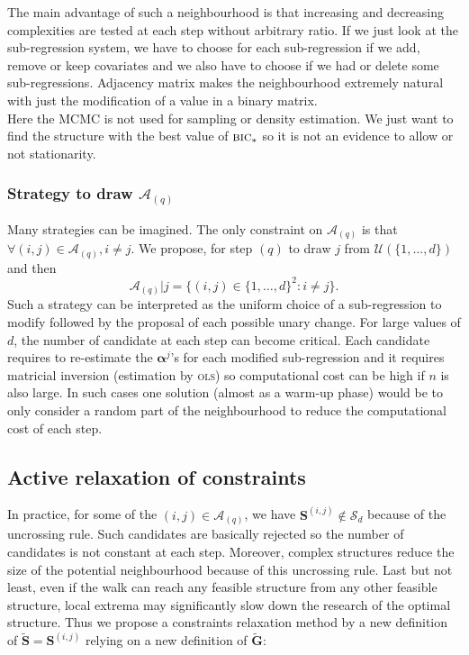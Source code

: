 \documentclass[12pt,a4paper]{report}
\begin{document}
The main advantage of such a neighbourhood is that increasing and decreasing complexities are tested at each step without arbitrary ratio. If we just look at the sub-regression system, we have to choose for each sub-regression if we add, remove or keep covariates and we also have to choose if we had or delete some sub-regressions. Adjacency matrix makes the neighbourhood extremely natural with just the modification of a value in a binary matrix. \\
Here the MCMC is not used for sampling or density estimation. We just want to find the structure with the best value of $\mbox{{\sc bic}}_*$ so it is not an evidence to allow or not stationarity. 
		\subsubsection{Strategy to draw $\mathcal{A}_{(q)}$}
			Many strategies can be imagined. 
		The only constraint on $\mathcal{A}_{(q)}$ is that $\forall (i,j) \in \mathcal{A}_{(q)}, i\neq j$.				
		We propose, for step $(q)$ to draw $j$ from $\mathcal{U}(\{1,\dots,d\})$ and then 
		\begin{equation}
			\mathcal{A}_{(q)}|j=\{ (i,j) \in  \{1,\dots,d\}^2 :i \neq j \}. \nonumber 
		\end{equation}
			Such a strategy can be interpreted as the uniform choice of a sub-regression to modify followed by the proposal of each possible unary change.
			For large values of $d$, the number of candidate at each step can become critical. Each candidate requires to re-estimate the $\boldsymbol{\alpha}^j$'s for each modified sub-regression and it requires matricial inversion (estimation by \textsc{ols}) so computational cost can be high if $n$ is also large. In such cases one solution (almost as a warm-up phase) would be to only consider a random part of the neighbourhood to reduce the computational cost of each step.
		\subsection{Active relaxation of constraints}
		In practice, for some of the $(i,j) \in \mathcal{A}_{(q)}$, we have $\boldsymbol{S}^{(i,j)}\notin \mathcal{S}_d$ because of the uncrossing rule. Such candidates are basically rejected so the number of candidates is not constant at each step. Moreover, complex structures reduce the size of the potential neighbourhood because of this uncrossing rule. Last but not least, even if the walk can reach any feasible structure from any other feasible structure, local extrema may significantly slow down the research of the optimal structure.
		Thus we propose a constraints relaxation method by a new definition of $\tilde{\boldsymbol{S}}=\boldsymbol{S}^{(i,j)}$ relying on a new definition of $\tilde{\boldsymbol{G}}$:
\end{document}
